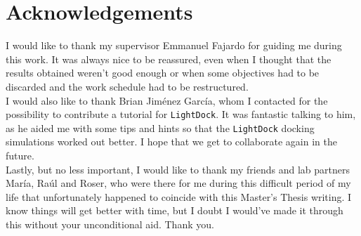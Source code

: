 \documentclass[a4paper,12pt]{article}
\begin{document}
\pagebreak


\tableofcontents

\pagebreak


\listoffigures

\pagebreak

\section*{Acknowledgements}

I would like to thank my supervisor Emmanuel Fajardo for guiding me during this work. It was always nice to be reassured, even when I thought that the results obtained weren't good enough or when some objectives had to be discarded and the work schedule had to be restructured.\\

I would also like to thank Brian Jiménez García, whom I contacted for the possibility to contribute a tutorial for \texttt{LightDock}. It was fantastic talking to him, as he aided me with some tips and hints so that the \texttt{LightDock} docking simulations worked out better. I hope that we get to collaborate again in the future.\\

Lastly, but no less important, I would like to thank my friends and lab partners María, Raúl and Roser, who were there for me during this difficult period of my life that unfortunately happened to coincide with this Master's Thesis writing. I know things will get better with time, but I doubt I would've made it through this without your unconditional aid. Thank you.

\pagebreak


\end{document}
